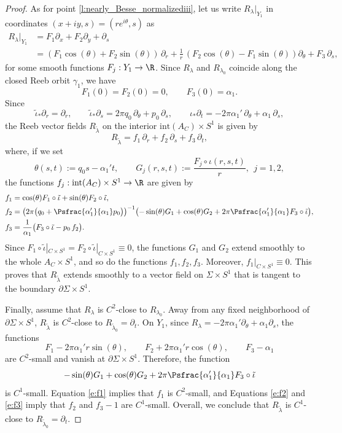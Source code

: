 \begin{proof}
As for point \eqref{l:nearly_Besse_normalizediii}, let us write $R_\lambda|_{Y_1}$ in coordinates $(x+iy,s)=(re^{i\theta},s)$ as
\begin{align*}
R_\lambda|_{Y_1}
&= F_1\partial_x + F_2\partial_y + \partial_s\\
&= (F_1\cos(\theta)+F_2\sin(\theta))\,\partial_r + \frac1r\,(F_2\cos(\theta) - F_1\sin(\theta)) \partial_\theta + F_3\,\partial_s,
\end{align*}
for some smooth functions $F_j:Y_1\to\R$. Since $R_\lambda$ and $R_{\lambda_0}$ coincide along the closed Reeb orbit $\gamma_1$, we have
\[
F_1(0)=F_2(0)=0,\qquad F_3(0)=\alpha_1.
\]
Since
\[
\tilde\iota_*\partial_r=\partial_r,
\qquad
\tilde\iota_*\partial_s=2\pi q_0\,\partial_\theta + p_0\,\partial_s,
\qquad
\iota_*\partial_t= -2\pi\alpha_1'\,\partial_\theta + \alpha_1\,\partial_s,
\]
the Reeb vector fields $R_{\tilde\lambda}$ on the interior $\mathrm{int}(A_C)\times S^1$ is given by
\[
R_{\tilde\lambda}=f_1\,\partial_r + f_2\,\partial_s + f_3\,\partial_t,
\]
where, if we set
\[
\theta(s,t) :=q_0s-\alpha_1't,\qquad G_j(r,s,t):=\frac{F_j\circ\iota(r,s,t)}{r},\ \ j=1,2,
\]
the functions $f_j:\mathrm{int}(A_C)\times S^1\to\R$ are given by
\begin{align}
\label{e:f1}
f_1 & = \cos(\theta)F_1\circ\tilde\iota+\sin(\theta)F_2\circ\tilde\iota,\\
\label{e:f2}
f_2 & = \big( 2\pi\big(q_0+\Psfrac{\alpha_1'}{\alpha_1}p_0\big)\big)^{-1} \bigl( -\sin(\theta)G_1 +\cos(\theta)G_2 + 2\pi\Psfrac{\alpha_1'}{\alpha_1} F_3\circ\tilde\iota\bigr),\\
\label{e:f3}
f_3& = \frac1{\alpha_1}\big(F_3\circ\tilde\iota-p_0\,f_2\big).
\end{align}
Since $F_1\circ\tilde\iota|_{C\times S^1}=F_2\circ\tilde\iota|_{C\times S^1}\equiv0$, the functions $G_1$ and $G_2$ extend smoothly to the whole $A_C\times S^1$, and so do the functions $f_1,f_2,f_3$. Moreover, $f_1|_{C\times S^1}\equiv0$. This proves that $R_{\tilde\lambda}$ extends smoothly to a vector field on $\Sigma\times S^1$ that is tangent to the boundary $\partial\Sigma\times S^1$.

Finally, assume that $R_\lambda$ is $C^2$-close to $R_{\lambda_0}$. Away from any fixed neighborhood of $\partial\Sigma\times S^1$, $R_{\tilde\lambda}$ is $C^2$-close to $R_{\tilde\lambda_0}=\partial_t$. On $Y_1$, since $R_\lambda=-2\pi\alpha_1'\partial_\theta+\alpha_1\partial_s$, the functions
\[
F_1-2\pi\alpha_1' r\sin(\theta),\qquad
F_2+2\pi\alpha_1' r\cos(\theta),\qquad
F_3-\alpha_1
\]
are $C^2$-small and vanish at $\partial\Sigma\times S^1$. Therefore, the function
\[
-\sin(\theta)G_1+\cos(\theta)G_2+2\pi\Psfrac{\alpha_1'}{\alpha_1} F_3\circ\tilde\iota
\] is $C^1$-small. Equation \eqref{e:f1} implies that $f_1$ is $C^2$-small, and Equations \eqref{e:f2} and \eqref{e:f3} imply that $f_2$ and $f_3-1$ are $C^1$-small. Overall, we conclude that $R_{\tilde\lambda}$ is $C^1$-close to $R_{\tilde\lambda_0}=\partial_t$.
\end{proof}

